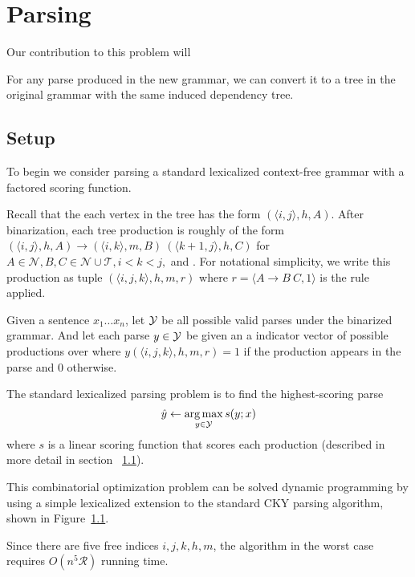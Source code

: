 \documentclass[11pt,letterpaper]{article}
\newcommand{\nonterms}{\mathcal{N}}
\newcommand{\rules}{\mathcal{R}}
\newcommand{\terms}{\mathcal{T}}
\newcommand{\Span}[1]{\langle #1 \rangle}
\begin{document}


\section{Parsing}

Our contribution to this problem will


For any parse produced in the new grammar, we can convert it to a tree
in the original grammar with the same induced dependency tree.


\subsection{Setup}

To begin we consider parsing a standard lexicalized context-free grammar with a
factored scoring function.

Recall that the each vertex in the tree has the form $(\Span{i, j}, h,
A)$. After binarization, each tree production is roughly of the form
$(\Span{i, j}, h, A) \rightarrow (\Span{i, k}, m, B)\ (\Span{k+1, j}, h, C)$ for $A \in \nonterms, B, C \in \nonterms \cup \terms, i < k < j,$ and  .
For notational simplicity, we write this production as tuple $(\Span{i ,j , k}, h, m, r)$
where $r = \langle A \rightarrow B\ C, 1\rangle $ is the rule applied.

Given a sentence $x_1 \ldots x_n$, let ${\cal Y}$ be all possible valid parses
under the binarized grammar. And let each parse $y\in {\cal Y}$  be given an a indicator
vector of possible productions over where $y(\Span{i ,j , k}, h, m, r) = 1$ if the
production appears in the parse and $0$ otherwise.

The standard lexicalized parsing problem is to find the highest-scoring parse \[ \hat{y} \gets \operatorname*{arg\,max}_{y \in {\cal Y}} s(y;x) \] where
$s$ is a linear scoring function that scores each production (described in more detail in section ~\ref{}).

This combinatorial optimization problem can be solved dynamic
programming by using a simple lexicalized extension to the standard
CKY parsing algorithm, shown in Figure~\ref{}.

Since there are five free indices $i, j, k, h, m$, the algorithm in the worst case requires $O(n^5 \rules)$ running time.
\end{document}
